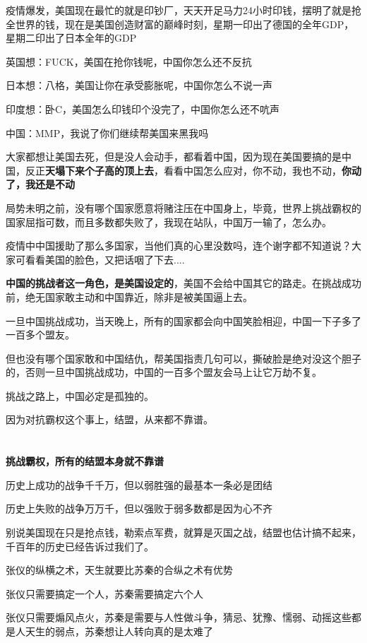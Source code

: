 \documentclass[UTF8, 11pt, oneside]{ctexart}
\newcommand{\zd}[1]{\textbf{\textcolor[RGB]{123,12,0}{#1}}} %
\begin{document}
疫情爆发，美国现在最忙的就是印钞厂，天天开足马力24小时印钱，摆明了就是抢全世界的钱，现在是美国创造财富的巅峰时刻，星期一印出了德国的全年GDP，星期二印出了日本全年的GDP

英国想：FUCK，美国在抢你钱呢，中国你怎么还不反抗

日本想：八格，美国让你在承受膨胀呢，中国你怎么不说一声

印度想：卧C，美国怎么印钱印个没完了，中国你怎么还不吭声

中国：MMP，我说了你们继续帮美国来黑我吗

大家都想让美国去死，但是没人会动手，都看着中国，因为现在美国要搞的是中国，反正\zd{天塌下来个子高的顶上去}，看看中国怎么应对，你不动，我也不动，\zd{你动了，我还是不动}

局势未明之前，没有哪个国家愿意将赌注压在中国身上，毕竟，世界上挑战霸权的国家屈指可数，而且多数都失败了，我现在站队，中国万一输了，怎么办。

疫情中中国援助了那么多国家，当他们真的心里没数吗，连个谢字都不知道说？大家可看看美国的脸色，又把话咽了下去....

\zd{中国的挑战者这一角色，是美国设定的}，美国不会给中国其它的路走。在挑战成功前，绝无国家敢主动和中国靠近，除非是被美国逼上去。

一旦中国挑战成功，当天晚上，所有的国家都会向中国笑脸相迎，中国一下子多了一百多个盟友。

但也没有哪个国家敢和中国结仇，帮美国指责几句可以，撕破脸是绝对没这个胆子的，否则一旦中国挑战成功，中国的一百多个盟友会马上让它万劫不复。

挑战之路上，中国必定是孤独的。

因为对抗霸权这个事上，结盟，从来都不靠谱。



\section{}

\zd{挑战霸权，所有的结盟本身就不靠谱}

历史上成功的战争千千万，但以弱胜强的最基本一条必是团结

历史上失败的战争万万千，但以强败于弱多数都是因为心不齐

别说美国现在只是抢点钱，勒索点军费，就算是灭国之战，结盟也估计搞不起来，千百年的历史已经告诉过我们了。

张仪的纵横之术，天生就要比苏秦的合纵之术有优势

张仪只需要搞定一个人，苏秦需要搞定六个人

张仪只需要煽风点火，苏秦是需要与人性做斗争，猜忌、犹豫、懦弱、动摇这些都是人天生的弱点，苏秦想让人转向真的是太难了
\end{document}
